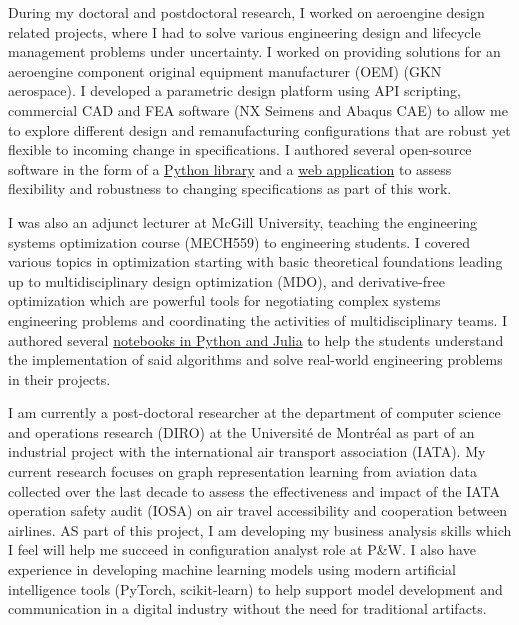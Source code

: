 \documentclass[12pt]{article} %
\begin{document}
\medskip %

During my doctoral and postdoctoral research, I worked on aeroengine design related projects, where I had to solve various engineering design and lifecycle management problems under uncertainty. I worked on providing solutions for an aeroengine component original equipment manufacturer (OEM) (GKN aerospace). I developed a parametric design platform using API scripting, commercial CAD and FEA software (NX Seimens and Abaqus CAE) to allow me to explore different design and remanufacturing configurations that are robust yet flexible to incoming change in specifications. I authored several open-source software in the form of a \href{https://sed-group.github.io/mvmlib/index.html}{Python library} and a \href{https://github.com/khbalhandawi/scale_AM_webapp}{web application} to assess flexibility and robustness to changing specifications as part of this work.

\medskip %

I was also an adjunct lecturer at McGill University, teaching the engineering systems optimization course (MECH559) to engineering students. I covered various topics in optimization starting with basic theoretical foundations leading up to multidisciplinary design optimization (MDO), and derivative-free optimization which are powerful tools for negotiating complex systems engineering problems and coordinating the activities of multidisciplinary teams. I authored several \href{https://github.com/khbalhandawi/MECH559_notebooks}{notebooks in Python and Julia} to help the students understand the implementation of said algorithms and solve real-world engineering problems in their projects.

\medskip %

I am currently a post-doctoral researcher at the department of computer science and operations research (DIRO) at the Universit\'{e} de Montr\'{e}al as part of an industrial project with the international air transport association (IATA). My current research focuses on graph representation learning from aviation data collected over the last decade to assess the effectiveness and impact of the IATA operation safety audit (IOSA) on air travel accessibility and cooperation between airlines. AS part of this project, I am developing my business analysis skills which I feel will help me succeed in configuration analyst role at P\&W. I also have experience in developing machine learning models using modern artificial intelligence tools (PyTorch, scikit-learn) to help support model development and communication in a digital industry without the need for traditional artifacts. 
\end{document}
